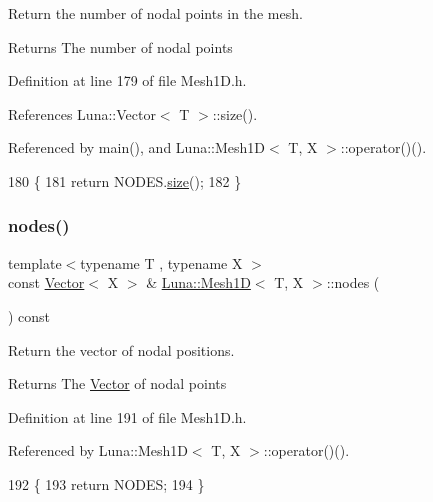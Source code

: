 Return the number of nodal points in the mesh. 

\begin{DoxyReturn}{Returns}
The number of nodal points 
\end{DoxyReturn}


Definition at line 179 of file Mesh1\+D.\+h.



References Luna\+::\+Vector$<$ T $>$\+::size().



Referenced by main(), and Luna\+::\+Mesh1\+D$<$ T, X $>$\+::operator()().


\begin{DoxyCode}
180   \{
181     \textcolor{keywordflow}{return} NODES.\hyperlink{classLuna_1_1Vector_ac9b6ed7a0df401728f27c193fbc8f4d8}{size}();
182   \}
\end{DoxyCode}
\mbox{\label{classLuna_1_1Mesh1D_a628f377e1a2d66a8ff53d052dcc697e2}} 
\subsubsection{\texorpdfstring{nodes()}{nodes()}}
{\footnotesize\ttfamily template$<$typename T , typename X $>$ \\
const \hyperlink{classLuna_1_1Vector}{Vector}$<$ X $>$ \& \hyperlink{classLuna_1_1Mesh1D}{Luna\+::\+Mesh1D}$<$ T, X $>$\+::nodes (\begin{DoxyParamCaption}{ }\end{DoxyParamCaption}) const\hspace{0.3cm}{\ttfamily [inline]}}



Return the vector of nodal positions. 

\begin{DoxyReturn}{Returns}
The \hyperlink{classLuna_1_1Vector}{Vector} of nodal points 
\end{DoxyReturn}


Definition at line 191 of file Mesh1\+D.\+h.



Referenced by Luna\+::\+Mesh1\+D$<$ T, X $>$\+::operator()().


\begin{DoxyCode}
192   \{
193     \textcolor{keywordflow}{return} NODES;
194   \}
\end{DoxyCode}
\mbox{\label{classLuna_1_1Mesh1D_a6cf5a08c5464bc7de45376cf3f5c1a68}} 
